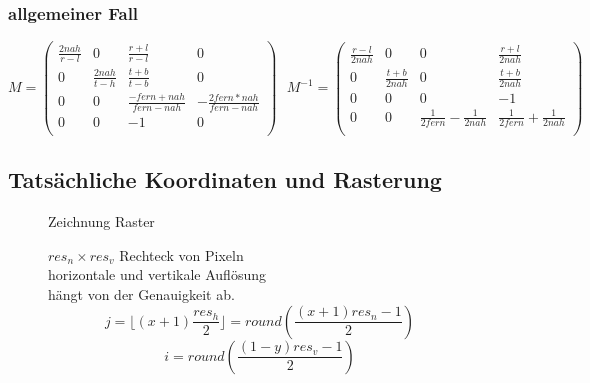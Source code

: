 \documentclass[11pt]{article}
\begin{document}
\subsubsection{allgemeiner Fall}
\begin{equation*}
M = \begin{pmatrix}
\frac{2nah}{r-l} & 0 & \frac{r+l}{r-l} & 0 \\
0 & \frac{2nah}{t - h} & \frac{t+b}{t-b} & 0 \\
0 & 0 & \frac{-fern+nah}{fern-nah} & -\frac{2fern *nah}{fern - nah} \\
0 & 0 & -1 & 0 \\
\end{pmatrix} \text{    }
M^{-1} = 
\begin{pmatrix}
\frac{r-l}{2nah} & 0 & 0 & \frac{r+l}{2nah} \\
0 & \frac{t+b}{2nah} & 0 &  \frac{t+b}{2nah} \\
0 & 0 & 0 & -1 \\
0 & 0 & \frac{1}{2fern}-\frac{1}{2nah} & \frac{1}{2fern}+\frac{1}{2nah}\\
\end{pmatrix}
\end{equation*}
\subsection{Tatsächliche Koordinaten und Rasterung}
\begin{figure}[!hb]
\begin{minipage}[c]{5cm}
{\color{red} Zeichnung Raster}
\end{minipage}
\hfill
\begin{minipage}[c]{8cm}
$res_n \times res_v$ Rechteck von Pixeln \\
horizontale und vertikale Auflösung \\
hängt von der Genauigkeit ab.
$$ j= \lfloor (x+1)\frac{res_h}{2}\rfloor  = round\left(\frac{(x+1)res_n-1}{2}\right)$$
$$ i = round\left(\frac{(1-y)res_v-1}{2}\right)$$
\end{minipage}
\end{figure}
\end{document}
